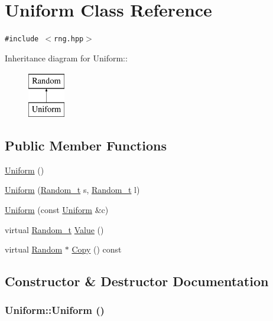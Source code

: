 \hypertarget{classUniform}{
\section{Uniform Class Reference}
\label{classUniform}
}
{\tt \#include $<$rng.hpp$>$}

Inheritance diagram for Uniform::\begin{figure}[H]
\begin{center}
\leavevmode
\includegraphics[height=2cm]{classUniform}
\end{center}
\end{figure}
\subsection*{Public Member Functions}
\begin{CompactItemize}
\item 
\hyperlink{classUniform_55d4df320842397431ce1b57c43924e8}{Uniform} ()
\item 
\hyperlink{classUniform_9b95c12d202e21df337cd579e4231759}{Uniform} (\hyperlink{rng_8hpp_ad41e7f5d86b1109b6a6a032c86cdd3f}{Random\_\-t} s, \hyperlink{rng_8hpp_ad41e7f5d86b1109b6a6a032c86cdd3f}{Random\_\-t} l)
\item 
\hyperlink{classUniform_6478f6ddeca630eb927c3bbef84702f3}{Uniform} (const \hyperlink{classUniform}{Uniform} \&c)
\item 
virtual \hyperlink{rng_8hpp_ad41e7f5d86b1109b6a6a032c86cdd3f}{Random\_\-t} \hyperlink{classUniform_0e0f9905cd20d6e6560d168ac75bbce2}{Value} ()
\item 
virtual \hyperlink{classRandom}{Random} $\ast$ \hyperlink{classUniform_11e73242faca88963143bdb3d296a48b}{Copy} () const 
\end{CompactItemize}


\subsection{Constructor \& Destructor Documentation}
\hypertarget{classUniform_55d4df320842397431ce1b57c43924e8}{
\subsubsection[{Uniform}]{\setlength{\rightskip}{0pt plus 5cm}Uniform::Uniform ()}}
\label{classUniform_55d4df320842397431ce1b57c43924e8}


